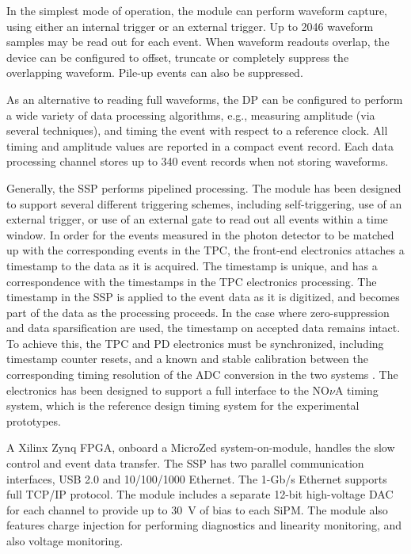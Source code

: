 In the simplest mode of operation, the module can perform waveform
capture, using either an internal trigger or an external trigger.  Up
to 2046 waveform samples may be read out for each event.  When
waveform readouts overlap, the device can be configured to offset,
truncate or completely suppress the overlapping waveform.  Pile-up
events can also be suppressed.

As an alternative to reading full waveforms, the DP can be configured
to perform a wide variety of data processing algorithms, e.g., measuring amplitude (via several techniques), and %
timing the
event with respect to a reference clock.  All timing and amplitude
values are reported in a compact event record.  Each data processing
channel stores up to 340 event records when not storing waveforms. 

Generally, the SSP performs pipelined processing.  The module has been
designed to support several different triggering schemes, including
self-triggering, use of an external trigger, or use of an external gate to
read out all events within a time window.  In order for the events
measured in the photon detector to be matched up with the
corresponding events in the TPC, the front-end electronics attaches a
timestamp to the data as it is acquired.  The timestamp is unique, and
has a correspondence with the timestamps in the TPC electronics
processing.  The timestamp in the SSP is applied to the event data as
it is digitized, and becomes part of the data as the processing
proceeds.  In the case where zero-suppression and data sparsification
are used, the timestamp on accepted data remains intact.  To achieve
this, the TPC and PD electronics must be synchronized, including
timestamp counter resets, and a known and stable calibration between
the corresponding timing resolution of the ADC conversion in the two
systems .  The electronics has been designed to support a full
interface to the NO$\nu$A timing system, which is the reference design timing
system for the experimental prototypes.

A Xilinx Zynq FPGA, onboard %
a MicroZed system-on-module,  handles the
slow control and event data transfer.  The SSP has two parallel
communication interfaces, USB 2.0 and 10/100/1000 Ethernet.  The 
1-Gb/s Ethernet supports full TCP/IP protocol.  The module includes a
separate 12-bit high-voltage DAC for each channel to provide up to 
30~V of bias to each SiPM.  The module also features charge injection for
performing diagnostics and linearity monitoring, and also voltage
monitoring. 

